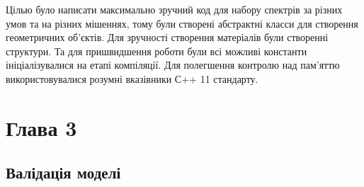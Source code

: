 \documentclass[a4paper, 14pt]{article}
\numberwithin{equation}{section}
\numberwithin{table}{section}
\begin{document}
	Цілью було написати максимально зручний код для набору спектрів за різних умов та на різних мішеннях, тому були створені абстрактні класси для створення геометричних об'єктів. Для зручності створення матеріалів були створенні структури. 
	Та для пришвидшення роботи були всі можливі константи ініціалізувалися на етапі компіляції. Для полегшення контролю над пам'яттю використовувалися розумні вказівники С++ 11 стандарту.
	
\newpage 
\section{Глава 3}
\setcounter{figure}{0}

\subsection{Валідація моделі}
\end{document}
